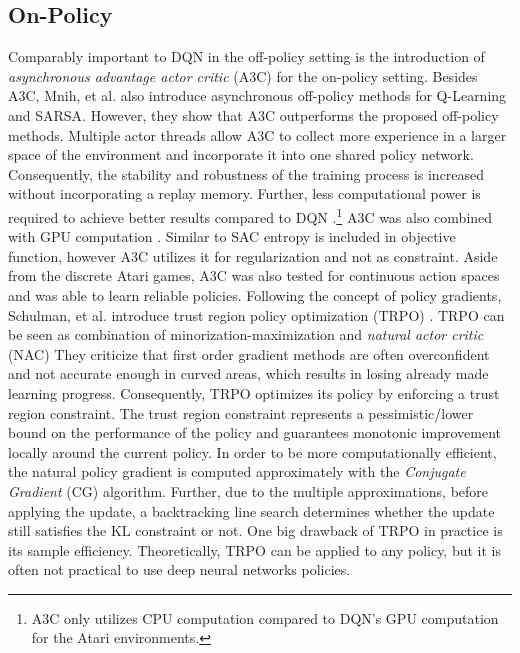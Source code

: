     \subsection{On-Policy}
    \label{sec:on-policy}
	Comparably important to DQN \cite{Mnih2015} in the off-policy setting is the introduction of \textit{asynchronous advantage actor critic} (A3C) \cite{Mnih2016} for the on-policy setting.
   	Besides A3C, Mnih, et al. also introduce asynchronous off-policy methods for Q-Learning and SARSA.
   	However, they show that A3C outperforms the proposed off-policy methods.
   	Multiple actor threads allow A3C to collect more experience in a larger space of the environment and incorporate it into one shared policy network.
   	Consequently, the stability and robustness of the training process is increased without incorporating a replay memory. 
	Further, less computational power is required to achieve better results compared to DQN \cite{Mnih2015}.\footnote{A3C only utilizes CPU computation compared to DQN's GPU computation for the Atari environments.}
	A3C was also combined with GPU computation \cite{Babaeizadeh2017}.
	Similar to SAC \cite{Haarnoja2018} entropy is included in objective function, however A3C utilizes it for regularization and not as constraint.
	Aside from the discrete Atari games, A3C was also tested for continuous action spaces and was able to learn reliable policies. 
    Following the concept of policy gradients, Schulman, et al. introduce trust region policy optimization (TRPO) \cite{Schulman2015}.
    TRPO can be seen as combination of minorization-maximization \cite{Hunter2004} and \textit{natural actor critic} (NAC) \cite{Peters2008a}
    They criticize that first order gradient methods are often overconfident and not accurate enough in curved areas, which results in losing already made learning progress. 
    Consequently, TRPO optimizes its policy by enforcing a trust region constraint. 
    The trust region constraint represents a pessimistic/lower bound on the performance of the policy and guarantees monotonic improvement locally around the current policy.	
    In order to be more computationally efficient, the natural policy gradient \cite{Kakade2001} is computed approximately with the \textit{Conjugate Gradient} (CG) algorithm.
    Further, due to the multiple approximations, before applying the update, a backtracking line search determines whether the update still satisfies the KL constraint or not. 
    One big drawback of TRPO in practice is its sample efficiency. 
    Theoretically, TRPO can be applied to any policy, but it is often not practical to use deep neural networks policies.
